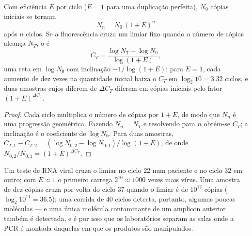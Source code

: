 \begin{theorem}\label{thm:b3:genetic-engineering:pcr}
Com eficiência $E$ por ciclo ($E = 1$ para uma duplicação perfeita),
$N_{0}$ cópias iniciais se tornam
\[
N_{n} = N_{0}\,(1 + E)^{n}
\]
após $n$ ciclos. Se a fluorescência cruza um limiar fixo quando o
número de cópias alcança $N_{T}$, o \emph{} é
\[
C_{T} = \frac{\log N_{T} - \log N_{0}}{\log(1 + E)},
\]
uma reta em $\log N_{0}$ com inclinação $-1/\log(1+E)$: para $E = 1$,
cada aumento de dez vezes na quantidade inicial baixa o $C_{T}$ em
$\log_{2} 10 = 3.32$ ciclos, e duas amostras cujos 
diferem de $\Delta C_{T}$ diferem em cópias iniciais pelo fator
$(1 + E)^{\Delta C_{T}}$.
\end{theorem}
\begin{proof}
Cada ciclo multiplica o número de cópias por $1 + E$, de modo que
$N_{n}$ é uma progressão geométrica. Fazendo $N_{n} = N_{T}$ e
resolvendo para $n$ obtém-se $C_{T}$; a inclinação é o coeficiente de
$\log N_{0}$. Para duas amostras, $C_{T,1} - C_{T,2} = (\log N_{0,2} - \log N_{0,1})/\log(1+E)$, de onde $N_{0,2}/N_{0,1} = (1+E)^{\Delta C_{T}}$.
\end{proof}

\begin{example}\label{ex:b3:genetic-engineering:qpcr}
Um teste de RNA viral cruza o limiar no ciclo $22$ num paciente e no
ciclo $32$ em outro; com $E \approx 1$ o primeiro carrega $2^{10}
\approx 1000$ vezes mais vírus. Uma amostra de dez cópias cruza por
volta do ciclo $37$ quando o limiar é de $10^{12}$ cópias
($\log_{2} 10^{11} =
36.5$); uma corrida de $40$ ciclos detecta,
portanto, algumas poucas moléculas --- e uma única molécula
contaminante de um amplicon anterior também é detectada, e é por isso
que os laboratórios separam as salas onde a PCR é montada daquelas em
que os produtos são manipulados.
\end{example}


